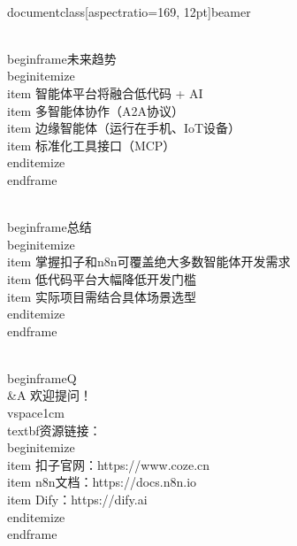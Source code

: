\\documentclass[aspectratio=169, 12pt]{beamer}
\begin{document}
\\begin{frame}{未来趋势}
\\begin{itemize}
\\item 智能体平台将融合低代码 + AI
\\item 多智能体协作（A2A协议）
\\item 边缘智能体（运行在手机、IoT设备）
\\item 标准化工具接口（MCP）
\\end{itemize}
\\end{frame}

\\begin{frame}{总结}
\\begin{itemize}
\\item 掌握扣子和n8n可覆盖绝大多数智能体开发需求
\\item 低代码平台大幅降低开发门槛
\\item 实际项目需结合具体场景选型
\\end{itemize}
\\end{frame}

\\begin{frame}{Q\\&A}
欢迎提问！
\\vspace{1cm}
\\textbf{资源链接：}
\\begin{itemize}
\\item 扣子官网：https://www.coze.cn
\\item n8n文档：https://docs.n8n.io
\\item Dify：https://dify.ai
\\end{itemize}
\\end{frame}

\
\end{document}
